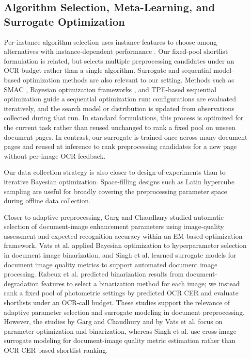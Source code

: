 \documentclass[pdflatex,sn-basic,Numbered,iicol]{sn-jnl}
\newcounter{algorithm}
\begin{document}
\subsection{Algorithm Selection, Meta-Learning, and Surrogate Optimization}

Per-instance algorithm selection uses instance features to choose among alternatives with instance-dependent performance \cite{rice1976selection}. Our fixed-pool shortlist formulation is related, but selects multiple preprocessing candidates under an OCR budget rather than a single algorithm. Surrogate and sequential model-based optimization methods are also relevant to our setting. Methods such as SMAC \cite{hutter2011smac}, Bayesian optimization frameworks \cite{snoek2012practical}, and TPE-based sequential optimization \cite{bergstra2011algorithms} guide a sequential optimization run: configurations are evaluated iteratively, and the search model or distribution is updated from observations collected during that run. In standard formulations, this process is optimized for the current task rather than reused unchanged to rank a fixed pool on unseen document pages. In contrast, our surrogate is trained once across many document pages and reused at inference to rank preprocessing candidates for a new page without per-image OCR feedback.

Our data collection strategy is also closer to design-of-experiments than to iterative Bayesian optimization. Space-filling designs such as Latin hypercube sampling \cite{mckay1979lhs} are useful for broadly covering the preprocessing parameter space during offline data collection.

Closer to adaptive preprocessing, Garg and Chaudhury \cite{garg2016adaptive} studied automatic selection of document-image enhancement parameters using image-quality assessment and expected recognition accuracy within an EM-based optimization framework. Vats et al. \cite{vats2017bayesian} applied Bayesian optimization to hyperparameter selection in document image binarization, and Singh et al. \cite{singh2018surrogate} learned surrogate models for document image quality metrics to support automated document image processing. Rabeux et al. \cite{rabeux2014quality} predicted binarization results from document-degradation features to select a binarization method for each image; we instead rank a fixed pool of photometric settings by predicted OCR CER and evaluate shortlists under an OCR-call budget. These studies support the relevance of adaptive parameter selection and surrogate modeling in document preprocessing. However, the studies by Garg and Chaudhury and by Vats et al. focus on parameter optimization and binarization, whereas Singh et al. use cross-image surrogate modeling for document-image quality metric estimation rather than OCR-CER-based shortlist ranking.
\end{document}
